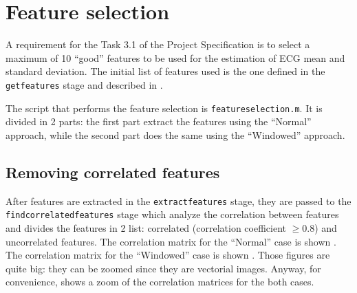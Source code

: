 \section{Feature selection}\label{sec:featureselection}

A requirement for the Task 3.1 of the Project Specification is to select a
maximum of 10 ``good'' features to be used for the estimation of ECG mean and
standard deviation. The initial list of features used is the one defined in the
\texttt{getfeatures} stage and described in .

The script that performs the feature selection is \texttt{featureselection.m}.
It is divided in 2 parts: the first part extract the features using the
``Normal'' approach, while the second part does the same using the ``Windowed''
approach.

\subsection{Removing correlated features}\label{subsec:dropcorrelatedfeatures}

After features are extracted in the \texttt{extractfeatures} stage, they are
passed to the \texttt{findcorrelatedfeatures} stage which analyze the
correlation between features and divides the features in 2 list: correlated
(correlation coefficient \(\ge 0.8\)) and uncorrelated features. The
correlation matrix for the ``Normal'' case is shown
. The correlation matrix for the ``Windowed'' case
is shown . Those figures are quite big:
they can be zoomed since they are vectorial images. Anyway, for convenience,
 shows a zoom of the correlation matrices for the
both cases.

